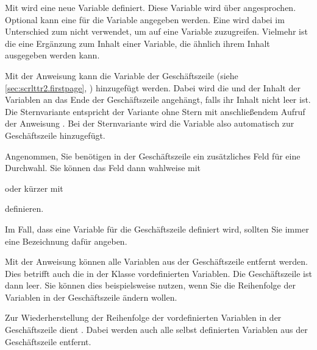 \begin{Declaration}
\end{Declaration}
Mit  wird eine neue Variable definiert. Diese Variable wird
über  angesprochen. Optional kann eine  für die
Variable  angegeben werden. Eine  wird dabei im
Unterschied zum  nicht verwendet, um auf eine Variable
zuzugreifen. Vielmehr ist die  eine Ergänzung zum Inhalt
einer Variable, die ähnlich ihrem Inhalt ausgegeben werden kann. 

Mit der Anweisung  kann die Variable  der
Geschäftszeile
(siehe \autoref{sec:scrlttr2.firstpage},
) hinzugefügt werden. Dabei wird die
 und der Inhalt der Variablen an das Ende der
Geschäftszeile angehängt, falls ihr Inhalt nicht leer ist. Die Sternvariante
 entspricht der Variante ohne Stern mit anschließendem
Aufruf der Anweisung . Bei der Sternvariante wird die
Variable also automatisch zur Geschäftszeile hinzugefügt.
\begin{Example}
  Angenommen, Sie benötigen in der Geschäftszeile ein zusätzliches Feld
  für eine Durchwahl. Sie können das Feld dann wahlweise mit
\begin{lstcode}
\end{lstcode}
  oder kürzer mit
\begin{lstcode}
\end{lstcode}
  definieren.
\end{Example}
Im Fall, dass eine Variable für die Geschäftszeile
definiert wird, sollten Sie immer eine Bezeichnung dafür angeben.

Mit der Anweisung  können alle Variablen aus der
Geschäftszeile entfernt werden. Dies betrifft auch die in der Klasse
vordefinierten Variablen. Die Geschäftszeile ist dann leer. Sie können dies
beispielsweise nutzen, wenn Sie die Reihenfolge der Variablen in der
Geschäftszeile ändern wollen.

Zur Wiederherstellung der Reihenfolge der vordefinierten Variablen in der
Geschäftszeile dient . Dabei werden auch alle
selbst definierten Variablen aus der Geschäftszeile entfernt.

